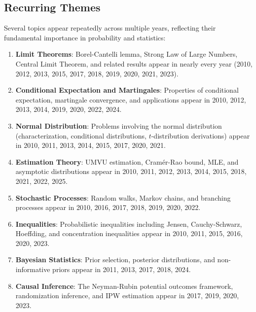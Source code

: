 \subsection{Recurring Themes}

Several topics appear repeatedly across multiple years, reflecting their fundamental importance in probability and statistics:

\begin{enumerate}
    \item \textbf{Limit Theorems}: Borel-Cantelli lemma, Strong Law of Large Numbers, Central Limit Theorem, and related results appear in nearly every year (2010, 2012, 2013, 2015, 2017, 2018, 2019, 2020, 2021, 2023).

    \item \textbf{Conditional Expectation and Martingales}: Properties of conditional expectation, martingale convergence, and applications appear in 2010, 2012, 2013, 2014, 2019, 2020, 2022, 2024.

    \item \textbf{Normal Distribution}: Problems involving the normal distribution (characterization, conditional distributions, $t$-distribution derivations) appear in 2010, 2011, 2013, 2014, 2015, 2017, 2020, 2021.

    \item \textbf{Estimation Theory}: UMVU estimation, Cram\'er-Rao bound, MLE, and asymptotic distributions appear in 2010, 2011, 2012, 2013, 2014, 2015, 2018, 2021, 2022, 2025.

    \item \textbf{Stochastic Processes}: Random walks, Markov chains, and branching processes appear in 2010, 2016, 2017, 2018, 2019, 2020, 2022.

    \item \textbf{Inequalities}: Probabilistic inequalities including Jensen, Cauchy-Schwarz, Hoeffding, and concentration inequalities appear in 2010, 2011, 2015, 2016, 2020, 2023.

    \item \textbf{Bayesian Statistics}: Prior selection, posterior distributions, and non-informative priors appear in 2011, 2013, 2017, 2018, 2024.

    \item \textbf{Causal Inference}: The Neyman-Rubin potential outcomes framework, randomization inference, and IPW estimation appear in 2017, 2019, 2020, 2023.
\end{enumerate}

